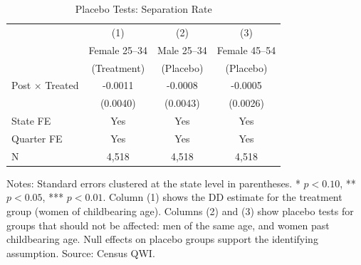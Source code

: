 \begin{table}[H]
\centering
\caption{Placebo Tests: Separation Rate}
\begin{threeparttable}
\begin{tabular}{lccc}
\toprule
 & (1) & (2) & (3) \\
 & Female 25--34 & Male 25--34 & Female 45--54 \\
 & (Treatment) & (Placebo) & (Placebo) \\
\midrule
Post $\times$ Treated & -0.0011 & -0.0008 & -0.0005 \\
 & (0.0040) & (0.0043) & (0.0026) \\
\midrule
State FE & Yes & Yes & Yes \\
Quarter FE & Yes & Yes & Yes \\
N & 4,518 & 4,518 & 4,518 \\
\bottomrule
\end{tabular}
\begin{tablenotes}[flushleft]
\small
\item Notes: Standard errors clustered at the state level in parentheses.
* $p<0.10$, ** $p<0.05$, *** $p<0.01$.
Column (1) shows the DD estimate for the treatment group (women of childbearing age).
Columns (2) and (3) show placebo tests for groups that should not be affected:
men of the same age, and women past childbearing age.
Null effects on placebo groups support the identifying assumption.
Source: Census QWI.
\end{tablenotes}
\end{threeparttable}
\label{tab:placebo}
\end{table}
